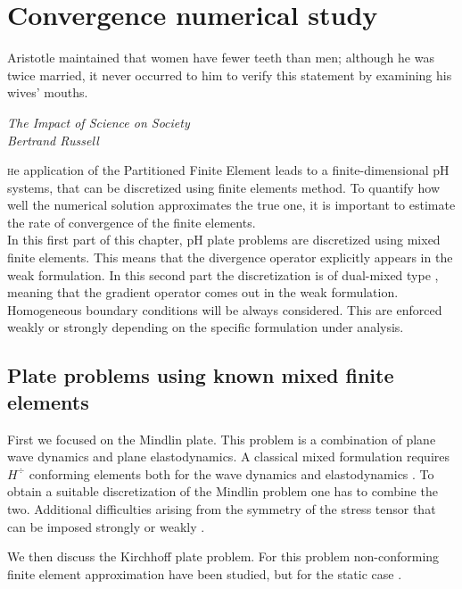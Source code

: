 \chapter{Convergence numerical study}\label{ch:conv}

\epigraph{ Aristotle maintained that women have fewer teeth than men; although he was twice married, it never occurred to him to verify this statement by examining his wives' mouths.}{\textit{The Impact of Science on Society \\ Bertrand Russell}}


\lettrine{\color{theme}{T}}he application of the Partitioned Finite Element leads to a finite-dimensional pH systems, that can be discretized using finite elements method. To quantify how well the numerical solution approximates the true one, it is important to estimate the rate of convergence of the finite elements. \\

In this first part of this chapter, pH plate problems are discretized using mixed finite elements. This means that the divergence operator explicitly appears in the weak formulation.   In this second part the discretization is of dual-mixed type \cite{arnold1990intro}, meaning that the gradient operator comes out in the weak formulation. \\

Homogeneous boundary conditions will be always considered. This are enforced weakly or strongly depending on the specific formulation under analysis.


\section{Plate problems using known mixed finite elements}

First we focused on the Mindlin plate. This problem is a combination of plane wave dynamics and plane elastodynamics. A classical mixed formulation requires $H^{\div}$ conforming elements both for the wave dynamics \cite{becache2000wave} and elastodynamics \cite{becache2001elas,arnold2014elastodynamics}. To obtain a suitable discretization of the Mindlin problem one has to combine the two. Additional difficulties arising from the symmetry of the stress tensor that can be imposed strongly \cite{becache2001elas} or weakly \cite{arnold2014elastodynamics}.

We then discuss the Kirchhoff plate problem. For this problem non-conforming finite element approximation have been studied, but for the static case \cite{blum1990}. \\

